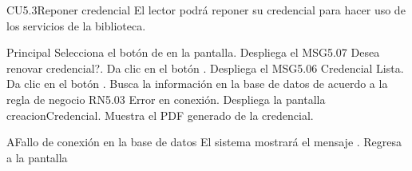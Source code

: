 
\begin{UseCase}{CU5.3}{Reponer credencial}{
	El lector podrá reponer su credencial para hacer uso de los servicios de la biblioteca.
}


	
\end{UseCase}



\begin{UCtrayectoria}{Principal}
	\UCpaso[\UCactor] Selecciona el botón  de en la pantalla.
	\UCpaso[\UCsist] Despliega el MSG5.07 Desea renovar credencial?.
	\UCpaso[\UCactor] Da clic en el botón  .
	\UCpaso[\UCsist] Despliega el MSG5.06 Credencial Lista.
	\UCpaso[\UCactor]Da clic en el botón .
	\UCpaso[\UCsist] Busca la información en la base de datos de acuerdo a la regla de negocio RN5.03 Error en conexión. 
	\UCpaso[\UCsist] Despliega la pantalla  creacionCredencial.
	\UCpaso[\UCsist] Muestra el PDF generado de la credencial.
	
\end{UCtrayectoria}

\begin{UCtrayectoriaA}{A}{Fallo de conexión en la base de datos}
			\UCpaso[\UCsist] El sistema mostrará el mensaje .
			\UCpaso[\UCsist] Regresa a la pantalla 	
\end{UCtrayectoriaA}
		
		
		
		
		
		
